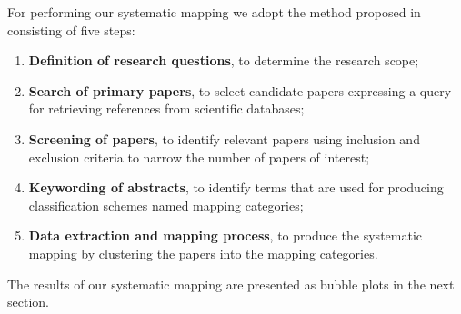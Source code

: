 For performing our systematic mapping we adopt the method proposed in \cite{SM} consisting  of five  steps: 
\begin{enumerate}
\item \textbf{Definition of research questions}, to determine the research
scope; 
\item \textbf{Search of primary papers}, to select candidate papers expressing a   query for retrieving references from scientific
databases; 
\item \textbf{Screening of papers}, to identify relevant papers using
inclusion and exclusion criteria   to narrow
the number of papers of interest; 
\item \textbf{Keywording of abstracts}, to identify terms that are used
for producing  classification schemes named mapping categories; 
\item \textbf{Data extraction and mapping process}, to produce the systematic
mapping by clustering the papers into the mapping categories.
\end{enumerate}


The results of our systematic mapping are presented as
bubble plots in the next section. 


